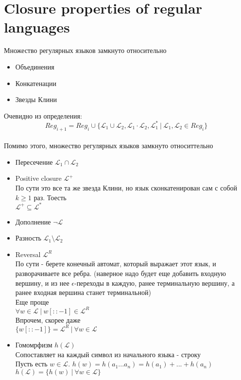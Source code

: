 \documentclass{article}
\begin{document}
	\section{Closure properties of regular languages}
	Множество регулярных языков замкнуто относительно
	\begin{itemize}
		\item Объединения
		\item Конкатенации
		\item Звезды Клини
	\end{itemize}
	Очевидно из определения:
	\[
	Reg_{i+1} = Reg_{i} \cup \{\mathcal{L}_1 \cup \mathcal{L}_2, \mathcal{L}_1 \cdot \mathcal{L}_2, \mathcal{L}^{*}_{1} \ | \ \mathcal{L}_1, \mathcal{L}_2 \in Reg_i\}\]\\
	Помимо этого, множество регулярных языков замкнуто относиттельно
	\begin{itemize}
		\item Пересечение \(\mathcal{L}_1 \cap \mathcal{L}_2\)
		\item Positive closure \(\mathcal{L}^+\)\\
		По сути это все та же звезда Клини, но язык сконкатенирован сам с собой \(k \geq 1\) раз. Тоесть\\
		\(\mathcal{L}^+ \subseteq \mathcal{L}^*\)
		\item Дополнение \(\neg \mathcal{L}\)
		\item Разность \(\mathcal{L}_1 \setminus \mathcal{L}_2\)
		\item Reversal \(\mathcal{L}^R\)\\
		По сути - берете конечный автомат, который выражает этот язык, и разворачиваете все ребра. (наверное надо будет еще добавить входную вершину, и из нее $\epsilon$-переходы в каждую, ранее терминальную вершину, а ранее входная вершина станет терминальной)\\
		Еще проще\\
		\(\forall w \in \mathcal{L} \ | \ w[::-1] \in \mathcal{L}^R \)\\
		Впрочем, скорее даже\\
		\(\{w[::-1]\} = \mathcal{L}^R \ | \ \forall w \in \mathcal{L} \)
		\item Гомомрфизм \(h(\mathcal{L})\)\\
		Сопоставляет на каждый символ из начального языка - строку\\
		Пусть есть $w \in \mathcal{L}$. $h(w) = h(a_1...a_n) = h(a_1) + ... + h(a_n)$\\
		$h(\mathcal{L}) = \{h(w) \ | \ \forall w \in \mathcal{L}\}$

\end{itemize}
\end{document}
